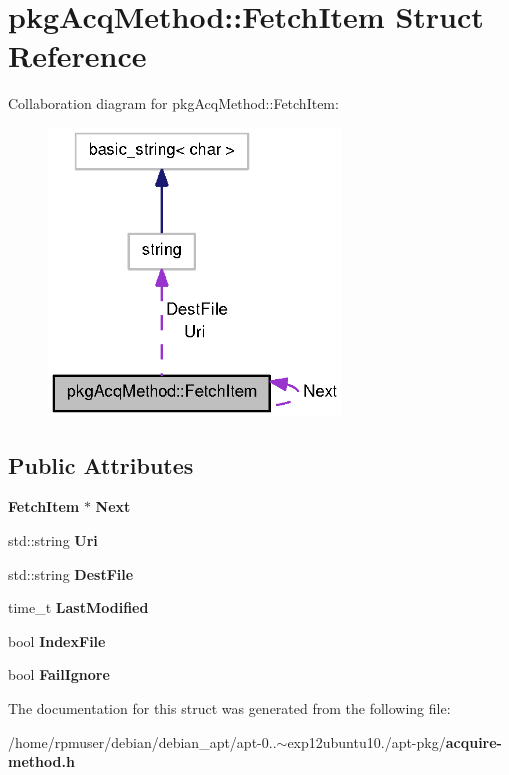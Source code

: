 \section{pkg\-Acq\-Method\-:\-:\-Fetch\-Item \-Struct \-Reference}
\label{structpkgAcqMethod_1_1FetchItem}


\-Collaboration diagram for pkg\-Acq\-Method\-:\-:\-Fetch\-Item\-:
\nopagebreak
\begin{figure}[H]
\begin{center}
\leavevmode
\includegraphics[width=220pt]{structpkgAcqMethod_1_1FetchItem__coll__graph}
\end{center}
\end{figure}
\subsection*{\-Public \-Attributes}
\begin{DoxyCompactItemize}
\item 
{\bf \-Fetch\-Item} $\ast$ {\bfseries \-Next}\label{structpkgAcqMethod_1_1FetchItem_a0b400807757f51009e37acd1b0f70d28}

\item 
std\-::string {\bfseries \-Uri}\label{structpkgAcqMethod_1_1FetchItem_a6e12b4b4ffa66bc62635ba43728a446d}

\item 
std\-::string {\bfseries \-Dest\-File}\label{structpkgAcqMethod_1_1FetchItem_ab4b5e2afff64c51303682cea9243f098}

\item 
time\-\_\-t {\bfseries \-Last\-Modified}\label{structpkgAcqMethod_1_1FetchItem_a7715b80087dbd228815c1cf9ff5cc166}

\item 
bool {\bfseries \-Index\-File}\label{structpkgAcqMethod_1_1FetchItem_ac2f65c43a09b70fa0772cfb7274d1b97}

\item 
bool {\bfseries \-Fail\-Ignore}\label{structpkgAcqMethod_1_1FetchItem_a98089f0c724c0e84249b0bae1a6fa8d3}

\end{DoxyCompactItemize}


\-The documentation for this struct was generated from the following file\-:\begin{DoxyCompactItemize}
\item 
/home/rpmuser/debian/debian\-\_\-apt/apt-\/0..$\sim$exp12ubuntu10./apt-\/pkg/{\bf acquire-\/method.\-h}\end{DoxyCompactItemize}
